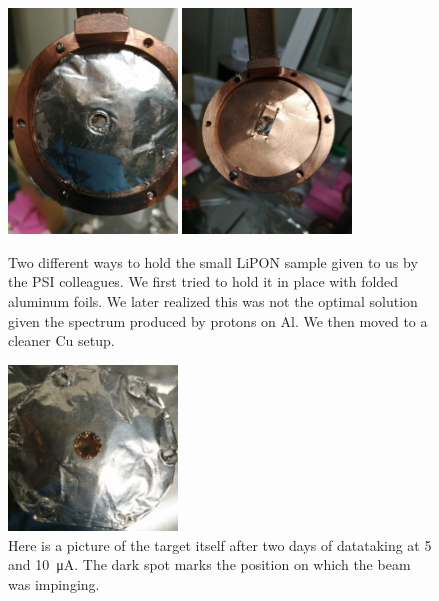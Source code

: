 \begin{refsection}
    \begin{figure}
        \centering
        \includegraphics[width = 0.4\textwidth]{Figures/X17/Dec2023/X17_Dec2023_AlTarget.jpeg}
        \includegraphics[width = 0.4\textwidth]{Figures/X17/Dec2023/X17_Dec2023_CuTarget.jpeg}
        \caption[Small LiPON target setup]{Two different ways to hold the small LiPON sample given to us by the PSI colleagues. We first tried to hold it in place with folded aluminum foils. We later realized this was not the optimal solution given the spectrum produced by protons on Al. We then moved to a cleaner Cu setup.}
        \label{fig:X17:target:LiPON:psi}
    \end{figure}
    \begin{figure}
        \centering

        \includegraphics[width = 0.4\textwidth]{Figures/X17/Dec2023/X17_Dec2023_AlTarget_burned.png}
        \caption[Small LiPON target]{Here is a picture of the target itself after two days of datataking at 5 and \SI{10}{\micro A}. The dark spot marks the position on which the beam was impinging.}
        \label{fig:X17:target:LiPON:psi}
    \end{figure}       

\end{refsection}
